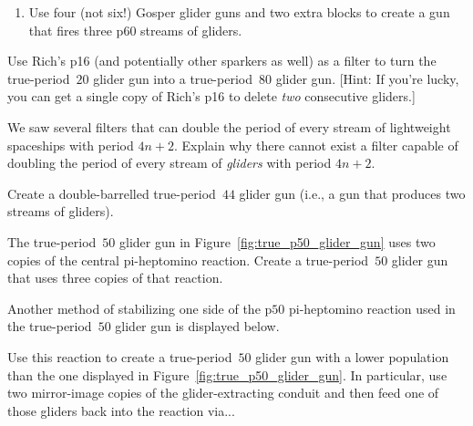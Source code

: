 \begin{multicols}{2}
\begin{problem}
\begin{enumerate}[label=\bf\color{ocre}(\alph*)]
		\item Use four (not six!) Gosper glider guns and two extra blocks to create a gun that fires three p$60$ streams of gliders.
	\end{enumerate}
\end{problem}


\mfilbreak


\begin{problem}\label{exer:p80_gun_rich_p16}
	Use Rich's p16 (and potentially other sparkers as well) as a filter to turn the true-period~$20$ glider gun into a true-period~$80$ glider gun. [Hint: If you're lucky, you can get a single copy of Rich's p16 to delete \emph{two} consecutive gliders.]
\end{problem}


\mfilbreak


\begin{problem}\label{exer:p4_glider_filter}
	We saw several filters that can double the period of every stream of lightweight spaceships with period $4n+2$. Explain why there cannot exist a filter capable of doubling the period of every stream of \emph{gliders} with period $4n+2$.
\end{problem}


\mfilbreak


\begin{problem}\label{exer:p44_double}
	Create a double-barrelled true-period~$44$ glider gun (i.e., a gun that produces two streams of gliders).
\end{problem}


\mfilbreak


\begin{problem}\label{exer:p50_triple_gun}
	The true-period~$50$ glider gun in Figure~\ref{fig:true_p50_glider_gun} uses two copies of the central pi-heptomino reaction. Create a true-period~$50$ glider gun that uses three copies of that reaction.
\end{problem}


\mfilbreak


\begin{problem}\label{exer:p50_glider_stabilize}
	Another method of stabilizing one side of the p$50$ pi-heptomino reaction used in the true-period~$50$ glider gun is displayed below.
	\begin{center}
	\end{center}
	\noindent Use this reaction to create a true-period~$50$ glider gun with a lower population than the one displayed in Figure~\ref{fig:true_p50_glider_gun}. In particular, use two mirror-image copies of the glider-extracting conduit and then feed one of those gliders back into the reaction via...\smallskip
	

\end{problem}
\end{multicols}
